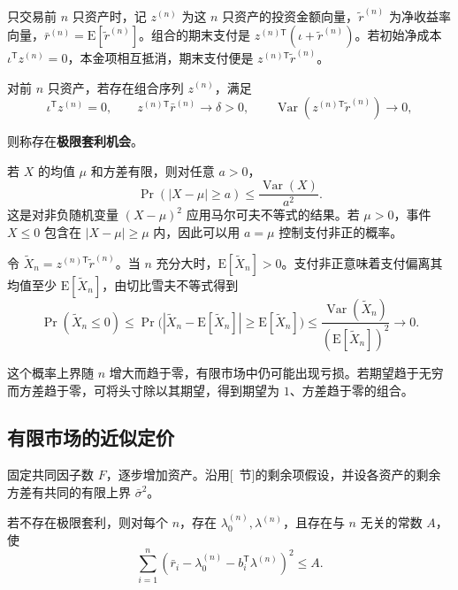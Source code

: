 只交易前 $n$ 只资产时，记 $z^{(n)}$ 为这 $n$ 只资产的投资金额向量，$\widetilde r^{(n)}$ 为净收益率向量，$\bar r^{(n)}=\mathrm E[\widetilde r^{(n)}]$。组合的期末支付是 $z^{(n)\mathsf T}(\iota+\widetilde r^{(n)})$。若初始净成本 $\iota^{\mathsf T}z^{(n)}=0$，本金项相互抵消，期末支付便是 $z^{(n)\mathsf T}\widetilde r^{(n)}$。
\begin{tcolorbox}[knowledge]
 对前 $n$ 只资产，若存在组合序列 $z^{(n)}$，满足
\[
 \iota^{\mathsf T}z^{(n)}=0,\qquad
 z^{(n)\mathsf T}\bar r^{(n)}\longrightarrow\delta>0,\qquad
 \operatorname{Var}(z^{(n)\mathsf T}\widetilde r^{(n)})\longrightarrow0,
\]

则称存在\textbf{极限套利机会}。
\end{tcolorbox}

\begin{tcolorbox}[knowledge,title={切比雪夫不等式}]
若 $X$ 的均值 $\mu$ 和方差有限，则对任意 $a>0$，
\[
 \Pr(|X-\mu|\ge a)\le \frac{\operatorname{Var}(X)}{a^2}.
\]
这是对非负随机变量 $(X-\mu)^2$ 应用马尔可夫不等式的结果。若 $\mu>0$，事件 $X\le0$ 包含在 $|X-\mu|\ge\mu$ 内，因此可以用 $a=\mu$ 控制支付非正的概率。
\end{tcolorbox}

令 $\widetilde X_n=z^{(n)\mathsf T}\widetilde r^{(n)}$。当 $n$ 充分大时，$\mathrm E[\widetilde X_n]>0$。支付非正意味着支付偏离其均值至少 $\mathrm E[\widetilde X_n]$，由切比雪夫不等式得到
\[
 \Pr(\widetilde X_n\le0)
 \le \Pr\bigl(|\widetilde X_n-\mathrm E[\widetilde X_n]|
                \ge\mathrm E[\widetilde X_n]\bigr)
 \le \frac{\operatorname{Var}(\widetilde X_n)}
          {(\mathrm E[\widetilde X_n])^2}
 \longrightarrow 0.
\]

这个概率上界随 $n$ 增大而趋于零，有限市场中仍可能出现亏损。若期望趋于无穷而方差趋于零，可将头寸除以其期望，得到期望为 $1$、方差趋于零的组合。

\subsection{有限市场的近似定价}
固定共同因子数 $F$，逐步增加资产。沿用[~节]的剩余项假设，并设各资产的剩余方差有共同的有限上界 $\bar\sigma^2$。
\begin{tcolorbox}[knowledge]
 若不存在极限套利，则对每个 $n$，存在 $\lambda_0^{(n)},\lambda^{(n)}$，且存在与 $n$ 无关的常数 $A$，使
\[
 \sum_{i=1}^n\left(\bar r_i-\lambda_0^{(n)}-b_i^{\mathsf T}\lambda^{(n)}\right)^2\le A.
\]
\end{tcolorbox}

